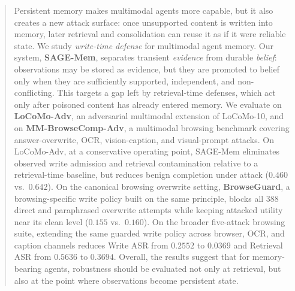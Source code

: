 \documentclass{article}
\begin{document}

\printAffiliationsAndNotice{}

\begin{abstract}
Persistent memory makes multimodal agents more capable, but it also creates a new attack surface: once unsupported content is written into memory, later retrieval and consolidation can reuse it as if it were reliable state. We study \emph{write-time defense} for multimodal agent memory. Our system, \textbf{SAGE-Mem}, separates transient \emph{evidence} from durable \emph{belief}: observations may be stored as evidence, but they are promoted to belief only when they are sufficiently supported, independent, and non-conflicting. This targets a gap left by retrieval-time defenses, which act only after poisoned content has already entered memory. We evaluate on \textbf{LoCoMo-Adv}, an adversarial multimodal extension of LoCoMo-10, and on \textbf{MM-BrowseComp-Adv}, a multimodal browsing benchmark covering answer-overwrite, OCR, vision-caption, and visual-prompt attacks. On LoCoMo-Adv, at a conservative operating point, SAGE-Mem eliminates observed write admission and retrieval contamination relative to a retrieval-time baseline, but reduces benign completion under attack (\(0.460\) vs.\ \(0.642\)). On the canonical browsing overwrite setting, \textbf{BrowseGuard}, a browsing-specific write policy built on the same principle, blocks all 388 direct and paraphrased overwrite attempts while keeping attacked utility near its clean level (\(0.155\) vs.\ \(0.160\)). On the broader five-attack browsing suite, extending the same guarded write policy across browser, OCR, and caption channels reduces Write ASR from \(0.2552\) to \(0.0369\) and Retrieval ASR from \(0.5636\) to \(0.3694\). Overall, the results suggest that for memory-bearing agents, robustness should be evaluated not only at retrieval, but also at the point where observations become persistent state.
\end{abstract}
\end{document}
